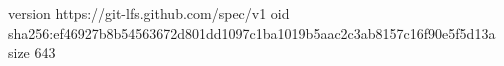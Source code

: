 version https://git-lfs.github.com/spec/v1
oid sha256:ef46927b8b54563672d801dd1097c1ba1019b5aac2c3ab8157c16f90e5f5d13a
size 643
